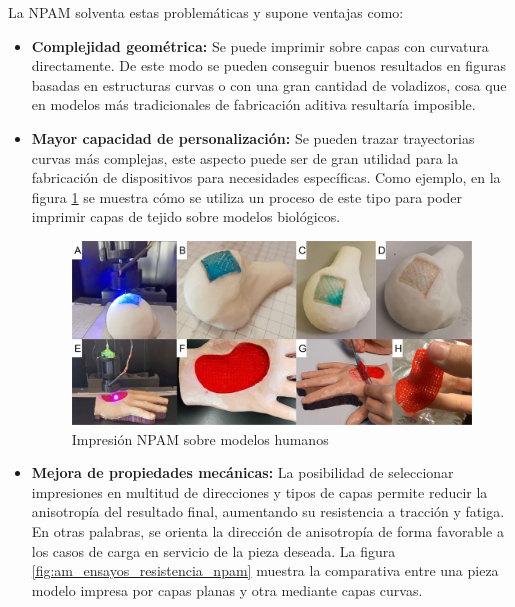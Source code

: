La \acrshort{NPAM} solventa estas problemáticas y supone ventajas como:
\begin{itemize}
    \item \textbf{Complejidad geométrica:} Se puede imprimir sobre capas con curvatura directamente. De este modo se pueden conseguir buenos resultados en figuras basadas en estructuras curvas o con una gran cantidad de voladizos, cosa que en modelos más tradicionales de fabricación aditiva resultaría imposible.

    \item \textbf{Mayor capacidad de personalización:} Se pueden trazar trayectorias curvas más complejas, este aspecto puede ser de gran utilidad para la fabricación de dispositivos para necesidades específicas. Como ejemplo, en la figura \ref{fig: am_geometria_anatomica} se muestra cómo se utiliza un proceso de este tipo para poder imprimir capas de tejido sobre modelos biológicos.
    
     \begin{figure}[h!]
         \centering
         \includegraphics[scale=0.5]{figuras/am_geometria_anatomica.jpeg}
         \caption{Impresión \acrshort{NPAM} sobre modelos humanos \cite{Fortunato_2023}}
         \label{fig: am_geometria_anatomica}
     \end{figure}

    \item \textbf{Mejora de propiedades mecánicas:} La posibilidad de seleccionar impresiones en multitud de direcciones y tipos de capas permite reducir la anisotropía del resultado final, aumentando su resistencia a tracción y fatiga. En otras palabras, se orienta la dirección de anisotropía de forma favorable a los casos de carga en servicio de la pieza deseada. La figura \ref{fig:am_ensayos_resistencia_npam} muestra la comparativa entre una pieza modelo impresa por capas planas y otra mediante capas curvas.


\end{itemize}
